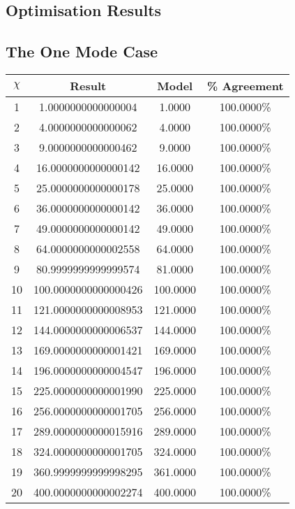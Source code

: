\documentclass[11pt,a4paper]{article}
\numberwithin{equation}{section}
\begin{document}
	\begin{appendices}
	
	\section{Optimisation Results} 
	\subsection{The One Mode Case}
	\label{sec:onemodetable}
	\begin{center}
		\begin{tabular}{c|cc|c}
			$\chi$ & Result & Model & \% Agreement \\
			\hline
			1 & 1.0000000000000004 & 1.0000 & 100.0000\% \\
			2 & 4.0000000000000062 & 4.0000 & 100.0000\% \\
			3 & 9.0000000000000462 & 9.0000 & 100.0000\% \\
			4 & 16.0000000000000142 & 16.0000 & 100.0000\% \\
			5 & 25.0000000000000178 & 25.0000 & 100.0000\% \\
			6 & 36.0000000000000142 & 36.0000 & 100.0000\% \\
			7 & 49.0000000000000142 & 49.0000 & 100.0000\%\\
			8 & 64.0000000000002558 & 64.0000 & 100.0000\% \\
			9 & 80.9999999999999574 & 81.0000 & 100.0000\% \\
			10 & 100.0000000000000426 & 100.0000 & 100.0000\% \\
			11 & 121.0000000000008953 & 121.0000 & 100.0000\% \\
			12 & 144.0000000000006537 & 144.0000 & 100.0000\% \\
			13 & 169.0000000000001421 & 169.0000 & 100.0000\% \\
			14 & 196.0000000000004547 & 196.0000 & 100.0000\% \\
			15 & 225.0000000000001990 & 225.0000 & 100.0000\% \\
			16 & 256.0000000000001705 & 256.0000 & 100.0000\% \\
			17 & 289.0000000000015916 & 289.0000 & 100.0000\% \\
			18 & 324.0000000000001705 & 324.0000 & 100.0000\% \\
			19 & 360.9999999999998295 & 361.0000 & 100.0000\% \\
			20 & 400.0000000000002274 & 400.0000 & 100.0000\% \\
			\hline
		\end{tabular}
	\end{center}


\end{appendices}
\end{document}
